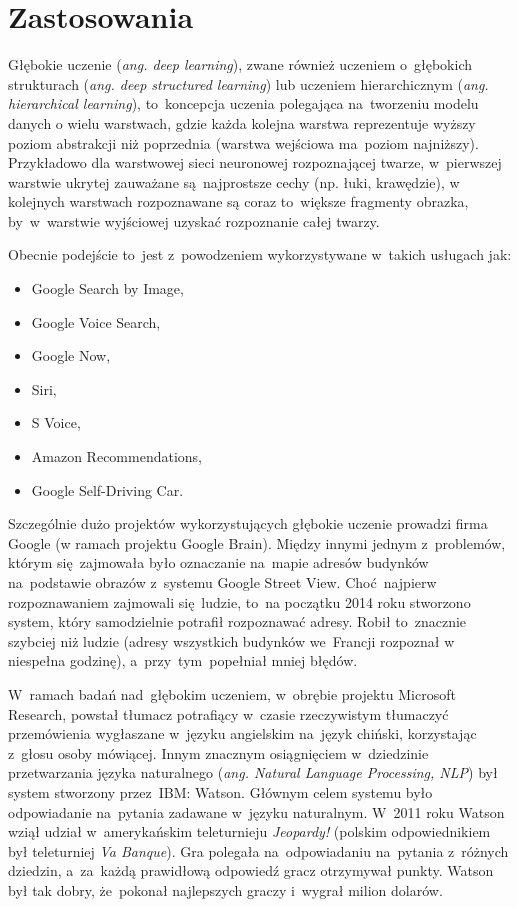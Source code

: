 \section{Zastosowania}
Głębokie uczenie (\textit{ang. deep learning}), zwane również uczeniem
o~głębokich strukturach (\textit{ang. deep structured learning}) lub uczeniem
hierarchicznym (\textit{ang. hierarchical learning}), to~koncepcja uczenia
polegająca na~tworzeniu modelu danych o wielu warstwach, gdzie każda kolejna
warstwa reprezentuje wyższy poziom abstrakcji niż poprzednia (warstwa wejściowa
ma~poziom najniższy). Przykładowo dla warstwowej sieci neuronowej rozpoznającej
twarze, w~pierwszej warstwie ukrytej zauważane są~najprostsze cechy (np. łuki,
krawędzie), w kolejnych warstwach rozpoznawane są coraz to~większe fragmenty
obrazka, by~w~warstwie wyjściowej uzyskać rozpoznanie całej twarzy.

Obecnie podejście to~jest z~powodzeniem wykorzystywane w~takich usługach jak:
\begin{itemize}
  \item Google Search by Image,
  \item Google Voice Search,
  \item Google Now,
  \item Siri,
  \item S Voice,
  \item Amazon Recommendations,
  \item Google Self-Driving Car.
\end{itemize}

Szczególnie dużo projektów wykorzystujących głębokie uczenie prowadzi firma
Google (w ramach projektu Google Brain). Między innymi jednym z~problemów,
którym się~zajmowała było oznaczanie na~mapie adresów budynków na~podstawie
obrazów z~systemu Google Street View. Choć~najpierw rozpoznawaniem zajmowali
się~ludzie, to~na początku 2014 roku stworzono system, który
samodzielnie potrafił rozpoznawać adresy. Robił to~znacznie szybciej niż ludzie
(adresy wszystkich budynków we~Francji rozpoznał w niespełna godzinę),
a~przy~tym~popełniał mniej błędów.

W~ramach badań nad~głębokim uczeniem, w~obrębie projektu Microsoft Research,
powstał tłumacz potrafiący w~czasie rzeczywistym tłumaczyć przemówienia
wygłaszane w~języku angielskim na~język chiński, korzystając z~głosu
osoby mówiącej. Innym znacznym osiągnięciem w~dziedzinie przetwarzania języka naturalnego (\textit{ang.
Natural Language Processing, NLP}) był system stworzony przez~IBM: Watson.
Głównym celem systemu było odpowiadanie na~pytania zadawane w~języku naturalnym.
W~2011 roku Watson wziął udział w~amerykańskim teleturnieju \textit{Jeopardy!} (polskim odpowiednikiem był
teleturniej \textit{Va Banque}). Gra polegała na~odpowiadaniu na~pytania z~różnych dziedzin, a~za~każdą
prawidłową odpowiedź gracz otrzymywał punkty. Watson był tak dobry, że~pokonał najlepszych graczy i~wygrał
milion dolarów.

